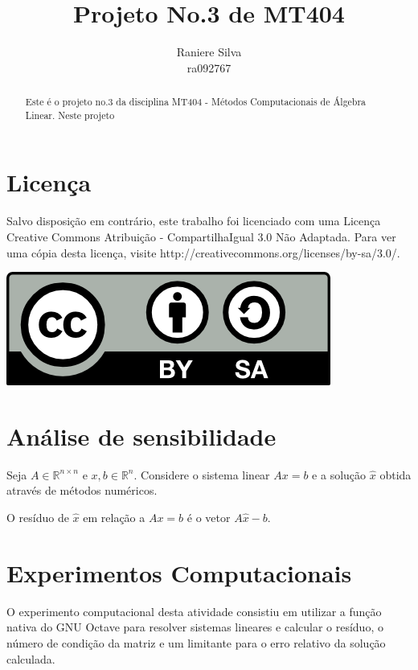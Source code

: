 \documentclass[12pt,a4paper]{article}
\begin{document}
\title{Projeto No.3 de MT404}
\author{Raniere Silva \\ ra092767}
\maketitle
\begin{abstract}
    Este \'{e} o projeto no.3 da disciplina MT404 - M\'{e}todos Computacionais
    de \'{A}lgebra Linear. Neste projeto 
\end{abstract}
\tableofcontents
\lstlistoflistings
\section*{Licen\c{c}a}
Salvo disposi\c{c}\~{a}o em contr\'{a}rio, este trabalho foi licenciado com uma
Licen\c{c}a Creative Commons Atribui\c{c}\~{a}o - CompartilhaIgual 3.0 N\~{a}o
Adaptada. Para ver uma c\'{o}pia desta licen\c{c}a, visite
http://creativecommons.org/licenses/by-sa/3.0/.
\begin{center}
    \includegraphics{../figuras/cc-by-sa.png}
\end{center}
\newpage
\section{An\'{a}lise de sensibilidade}
Seja $A \in \mathbb{R}^{n \times n}$ e $x, b \in \mathbb{R}^n$. Considere o
sistema linear $A x = b$ e a solu\c{c}\~{a}o $\hat{x}$ obtida atrav\'{e}s de
m\'{e}todos num\'{e}ricos.

\begin{defi}
    O res\'{i}duo de $\hat{x}$ em rela\c{c}\~{a}o a $A x = b$ \'{e} o vetor $A
    \hat{x} - b$.
\end{defi}

\section{Experimentos Computacionais}
O experimento computacional desta atividade consistiu em utilizar a
fun\c{c}\~{a}o nativa do GNU Octave para resolver sistemas lineares e calcular o
res\'{i}duo, o n\'{u}mero de condi\c{c}\~{a}o da matriz e um limitante para o
erro relativo da solu\c{c}\~{a}o calculada.
\end{document}
